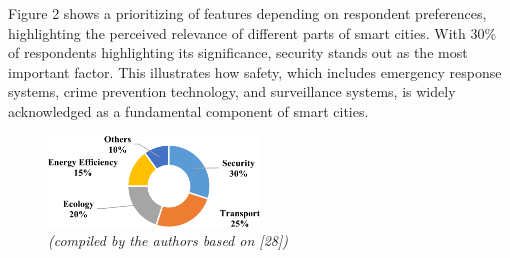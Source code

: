 \begin{multicols}{2}
Figure 2 shows a prioritizing of features depending on respondent
preferences, highlighting the perceived relevance of different parts of
smart cities. With 30\% of respondents highlighting its significance,
security stands out as the most important factor. This illustrates how
safety, which includes emergency response systems, crime prevention
technology, and surveillance systems, is widely acknowledged as a
fundamental component of smart cities.
\end{multicols}

\begin{figure}[H]
	\centering
	\includegraphics[width=0.5\textwidth]{media/ekon/Graph_13}
	\caption*{Fig. 2 - Prioritizing of features depending on respondent preferences}
	\caption*{\normalfont \emph{(compiled by the authors based on {[}28{]})}}
\end{figure}

